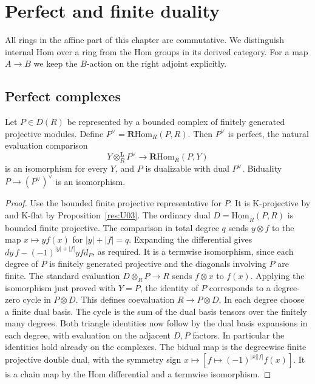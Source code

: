\chapter{Perfect and finite duality}
\label{ch:derived-duality}

All rings in the affine part of this chapter are commutative.
We distinguish internal Hom over a ring from the Hom groups in its
derived category. For a map \(A\to B\) we keep the \(B\)-action on
the right adjoint explicitly.

\section{Perfect complexes}

\begin{theorem}\label{res:U10}
Let \(P\in D(R)\) be represented by a bounded complex of finitely
generated projective modules. Define
\(P^\vee=\mathbf R\mathrm{Hom}_R(P,R)\).
Then \(P^\vee\) is perfect, the natural evaluation comparison
\[
 Y\otimes_R^{\mathbf L}P^\vee
     \longrightarrow\mathbf R\mathrm{Hom}_R(P,Y)
\]
is an isomorphism for every \(Y\), and \(P\) is dualizable
with dual \(P^\vee\). Biduality \(P\to(P^\vee)^\vee\) is an
isomorphism.
\end{theorem}
\begin{proof}
Use the bounded finite projective representative for \(P\).
It is K-projective by \cite[R03]{ha-core} and K-flat by
Proposition~\ref{res:U03}. The ordinary dual
\(D=\underline{\mathrm{Hom}}_R(P,R)\) is bounded finite
projective. The comparison in total degree \(q\) sends
\(y\otimes f\) to the map \(x\mapsto y f(x)\) for
\(|y|+|f|=q\). Expanding the differential gives
\(d y\, f-(-1)^{|y|+|f|} y f d_P\), as required.
It is a termwise isomorphism, since each degree of \(P\)
is finitely generated projective and the diagonals involving
\(P\) are finite. The standard evaluation \(D\otimes_R P\to R\)
sends \(f\otimes x\) to \(f(x)\). Applying the isomorphism just
proved with \(Y=P\), the identity of \(P\) corresponds to a
degree-zero cycle in \(P\otimes D\). This defines coevaluation
\(R\to P\otimes D\). In each degree choose a finite dual basis.
The cycle is the sum of the dual basis tensors over the
finitely many degrees. Both triangle identities now follow
by the dual basis expansions in each degree, with evaluation
on the adjacent \(D,P\) factors. In particular the identities
hold already on the complexes. The bidual map is the
degreewise finite projective double dual, with the symmetry
sign \(x\mapsto[f\mapsto(-1)^{|x||f|}f(x)]\).
It is a chain map by the Hom differential and a
termwise isomorphism.
\end{proof}

